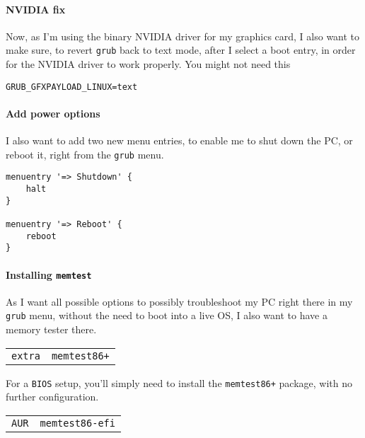 \documentclass[9pt]{report}
\newenvironment{packagetable}
{\begin{longtabu}to \textwidth [b]{X[1,r]|X[1,l]}}
{\end{longtabu}}
\begin{document}
\newpage

\hypertarget{x-nvidia-fix}{\paragraph{NVIDIA fix}}
Now, as I’m using the binary NVIDIA driver for my graphics card, I also want to make sure, to revert \texttt{grub} back to text mode, after I select a boot entry, in order for the NVIDIA driver to work properly.
You might not need this


\begin{verbatim}
GRUB_GFXPAYLOAD_LINUX=text
\end{verbatim}


\newpage

\hypertarget{x-add-power-options}{\paragraph{Add power options}}
I also want to add two new menu entries, to enable me to shut down the PC, or reboot it, right from the \texttt{grub} menu.


\begin{verbatim}
menuentry '=> Shutdown' {
    halt
}

menuentry '=> Reboot' {
    reboot
}
\end{verbatim}


\newpage

\hypertarget{x-installing-memtest}{\paragraph{Installing \texttt{memtest}}}
As I want all possible options to possibly troubleshoot my PC right there in my \texttt{grub} menu,  without the need to boot into a live OS, I also want to have a memory tester there.

\bigskip

\begin{packagetable}
    \texttt{extra} & \texttt{memtest86+} \\ 
\end{packagetable}

For a \texttt{BIOS} setup, you’ll simply need to install the \texttt{memtest86+} package, with no further configuration.

\bigskip

\begin{packagetable}
    \texttt{AUR} & \texttt{memtest86-efi} \\ 
\end{packagetable}
\end{document}
